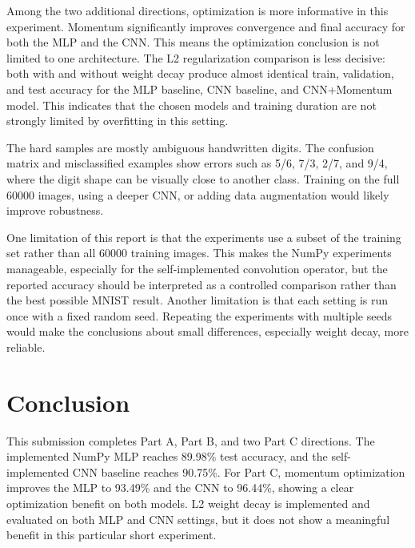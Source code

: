 \documentclass[11pt]{article}
\begin{document}
Among the two additional directions, optimization is more informative in this experiment. Momentum significantly improves convergence and final accuracy for both the MLP and the CNN. This means the optimization conclusion is not limited to one architecture. The L2 regularization comparison is less decisive: both with and without weight decay produce almost identical train, validation, and test accuracy for the MLP baseline, CNN baseline, and CNN+Momentum model. This indicates that the chosen models and training duration are not strongly limited by overfitting in this setting.

The hard samples are mostly ambiguous handwritten digits. The confusion matrix and misclassified examples show errors such as 5/6, 7/3, 2/7, and 9/4, where the digit shape can be visually close to another class. Training on the full 60000 images, using a deeper CNN, or adding data augmentation would likely improve robustness.

One limitation of this report is that the experiments use a subset of the training set rather than all 60000 training images. This makes the NumPy experiments manageable, especially for the self-implemented convolution operator, but the reported accuracy should be interpreted as a controlled comparison rather than the best possible MNIST result. Another limitation is that each setting is run once with a fixed random seed. Repeating the experiments with multiple seeds would make the conclusions about small differences, especially weight decay, more reliable.

\section{Conclusion}

This submission completes Part A, Part B, and two Part C directions. The implemented NumPy MLP reaches 89.98\% test accuracy, and the self-implemented CNN baseline reaches 90.75\%. For Part C, momentum optimization improves the MLP to 93.49\% and the CNN to 96.44\%, showing a clear optimization benefit on both models. L2 weight decay is implemented and evaluated on both MLP and CNN settings, but it does not show a meaningful benefit in this particular short experiment.
\end{document}
